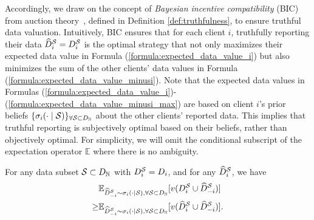 Accordingly, we draw on the concept of \textit{Bayesian incentive compatibility} (BIC) from auction theory~\cite{d1982bayesian}, defined in Definition \ref{def:truthfulness}, to ensure truthful data valuation.
Intuitively, BIC ensures that for each client $i$, truthfully reporting their data $\widehat{D}^{\mathcal{S}}_{i} =  D^{\mathcal{S}}_{i}$ is the optimal strategy that not only maximizes their expected data value in Formula (\ref{formula:expected_data_value_i}) but also minimizes the sum of the other clients' data values in Formula (\ref{formula:expected_data_value_minusi}). 
Note that the expected data values in Formulas (\ref{formula:expected_data_value_i})-(\ref{formula:expected_data_value_minusi_max}) are based on client 
$i$’s prior beliefs $\{\sigma_i(\cdot \mid \mathcal{S})\}_{\forall \mathcal{S} \subset D_{\mathbb{N}}}$ about the other clients' reported data. 
This implies that truthful reporting is subjectively optimal based on their beliefs, rather than objectively optimal.
For simplicity, we will omit the conditional subscript of the expectation operator $\mathbb{E}$ where there is no ambiguity.

\begin{assumption}
\label{ass:optimal_dataset}
    For any data subset $\mathcal{S} \subset D_{\mathbb{N}}$ with $D^{\mathcal{S}}_{i} = D_i$, and for any $\widehat{D}^{\mathcal{S}}_{i}$, we have
    \begin{align*}
        &\mathbb{E}_{\widehat{D}^{\mathcal{S}}_{-i} \sim \sigma_i(\cdot \mid \mathcal{S}), \forall \mathcal{S} \subset D_{\mathbb{N}}} [v(D^{\mathcal{S}}_{i} \cup \widehat{D}^{\mathcal{S}}_{-i})] \\
        \geq & \mathbb{E}_{\widehat{D}^{\mathcal{S}}_{-i} \sim \sigma_i(\cdot \mid \mathcal{S}), \forall \mathcal{S} \subset D_{\mathbb{N}}} [v(\widehat{D}^{\mathcal{S}}_{i} \cup \widehat{D}^{\mathcal{S}}_{-i})].
    \end{align*}
\end{assumption}


